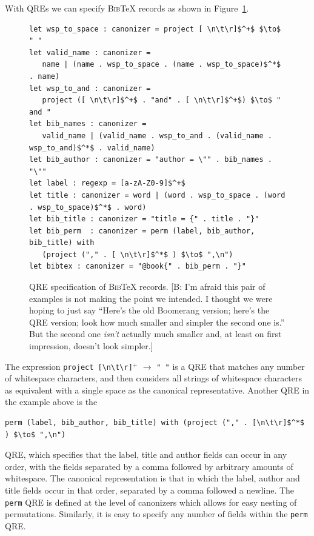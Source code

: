 \documentclass{svproc}
\newcommand{\cd}[1]{\lstinline[backgroundcolor=\color{white}]$#1$}
\newcommand{\FINISH}[3]{\ifdraft\textcolor{#1}{[#2: #3]}\fi}
\newcommand{\bcp}[1]{\FINISH{dkred}{B}{#1}}
\newcommand{\bibtex}{\textsc{Bib}\TeX{}}
\begin{document}
With QREs we can specify \bibtex{} records as shown in Figure~\ref{fig:example-qre}.

\begin{figure}[t]
\begin{lstlisting}
let wsp_to_space : canonizer = project [ \n\t\r]$^+$ $\to$ " "
let valid_name : canonizer = 
   name | (name . wsp_to_space . (name . wsp_to_space)$^*$ . name)
let wsp_to_and : canonizer = 
   project ([ \n\t\r]$^+$ . "and" . [ \n\t\r]$^+$) $\to$ " and "
let bib_names : canonizer =  
   valid_name | (valid_name . wsp_to_and . (valid_name . wsp_to_and)$^*$ . valid_name)
let bib_author : canonizer = "author = \"" . bib_names . "\""
let label : regexp = [a-zA-Z0-9]$^+$
let title : canonizer = word | (word . wsp_to_space . (word . wsp_to_space)$^*$ . word)
let bib_title : canonizer = "title = {" . title . "}"
let bib_perm  : canonizer = perm (label, bib_author, bib_title) with
   (project ("," . [ \n\t\r]$^*$ ) $\to$ ",\n")
let bibtex : canonizer = "@book{" . bib_perm . "}"
\end{lstlisting}

  
\caption{QRE specification of \bibtex{} records.  \bcp{I'm afraid this pair
    of examples is not making the point we intended.  I thought we were
    hoping to just say ``Here's the old Boomerang version; here's the QRE
    version; look how much smaller and simpler the second one is.''  But the
    second one {\em isn't} actually much smaller and, at least on first
    impression, doesn't look simpler.}}
  \label{fig:example-qre}
\end{figure}

The expression \cd{project [\n\t\r]}$^+$ $\to$ \cd{" "} is a QRE that matches any 
number of whitespace characters, and then considers all strings of whitespace
characters as equivalent with a single space as the canonical representative. 
Another QRE in the example above is the

\begin{center}
\begin{lstlisting}
perm (label, bib_author, bib_title) with (project ("," . [\n\t\r]$^*$ ) $\to$ ",\n")
\end{lstlisting}
\end{center}

\noindent QRE, which specifies that the label, title and author fields can occur
in any order, with the fields separated by a comma followed by arbitrary amounts
of whitespace. The canonical representation is that in which the label, author
and title fields occur in that order, separated by a comma followed a newline.
The \cd{perm} QRE is defined at the level of canonizers which allows for
easy nesting of permutations. Similarly, it is easy to specify any number of
fields within the \cd{perm} QRE.
\end{document}
